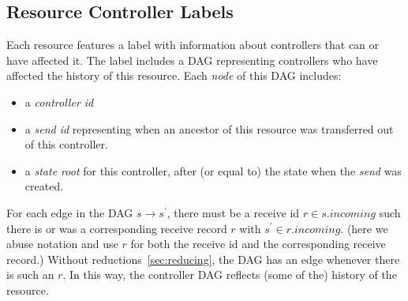 \documentclass[a4paper,USenglish,cleveref, autoref, thm-restate, anonymous]{lipics-v2021}
\begin{document}
% 
% 

\subsection{Resource Controller Labels}
Each resource features a label with information about controllers that can or have affected it.
The label includes a DAG representing controllers who have affected the history of this resource.
Each \textit{node} of this DAG includes:
\begin{itemize}
\item a \emph{controller id}
\item a \emph{send id} representing when an ancestor of this resource was transferred out of this controller. 
\item a \emph{state root} for this controller, after (or equal to) the state when the \emph{send} was created.
\end{itemize}
For each edge in the DAG $s\rightarrow s^\prime$, there must be a receive id $r\in s.incoming$ such there is or was a corresponding receive record $r$ with $s^\prime \in r.incoming$. 
(here we abuse notation and use $r$ for both the receive id and the corresponding receive record.)
Without reductions~\cref{sec:reducing}, the DAG has an edge whenever there is such an $r$.
In this way, the controller DAG reflects (some of the) history of the resource. 
\end{document}
